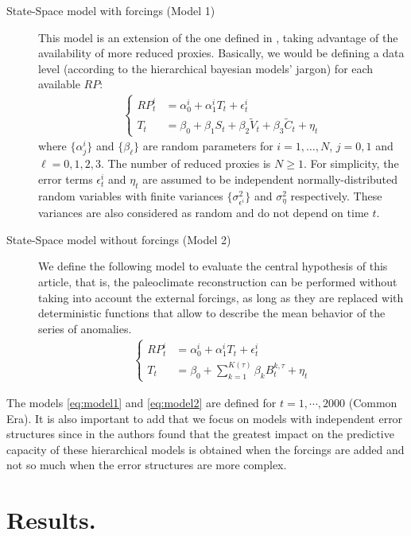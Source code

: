 \documentclass[11pt]{amsart}
\theoremstyle{plain}
\theoremstyle{definition}
\theoremstyle{remark}
\begin{document}
\begin{description}
\item[State-Space model with forcings (Model 1)]
This model is an extension of the one defined in \cite{Barboza2014}, taking
advantage of the availability of more reduced proxies. Basically, we would be
defining a data level (according to the hierarchical bayesian models' jargon)
for each available $RP$:
\begin{align}\label{eq:model1}
  \begin{cases}
    RP_t^i&=\alpha_0^i+\alpha_1^iT_t+\epsilon^i_t\\
  T_t&=\beta_0+\beta_1S_t+\beta_2\tilde V_t+\beta_3\tilde C_t+\eta_t
  \end{cases}
\end{align}
where $\{\alpha^i_j\}$ and $\{\beta_\ell\}$ are random parameters for
$i=1,\ldots,N$, $j=0,1$ and $\ell=0,1,2,3$. The number of reduced proxies is
$N\geq 1$. For simplicity, the error terms
$\epsilon^i_t$ and $\eta_t$ are assumed to be
independent normally-distributed random variables with finite variances
$\{\sigma^2_{\epsilon^i}\}$ and $\sigma^2_{\eta}$ respectively. These variances
are also considered as random and do not depend on time $t$.   
\item[State-Space model without forcings (Model 2)]
  We define the following model to evaluate the central hypothesis of this article, that is, the
paleoclimate reconstruction can be performed without taking into account the
external forcings, as long as they are replaced with deterministic
functions that allow to describe the mean behavior of the series of anomalies.
\begin{align}\label{eq:model2}
  \begin{cases}
    RP_t^i&=\alpha_0^i+\alpha_1^iT_t+\epsilon^i_t\\
  T_t&=\beta_0+\sum_{k=1}^{K(\tau)}\beta_k B_t^{k,\tau}+\eta_t
  \end{cases}
\end{align}
\end{description}
The models \eqref{eq:model1} and \eqref{eq:model2} are defined for
$t=1,\cdots,2000$ (Common Era). It is also important to add that we focus on
models with independent error structures since in \cite{Barboza2014} the authors
found that the greatest impact on the predictive capacity of these hierarchical
models is obtained when the forcings are added and not so much when the error
structures are more complex.

\section{Results.}
\label{sec:results}
\end{document}
